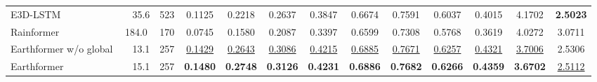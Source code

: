 \documentclass{article}
\begin{document}
\begin{table}[!tb]
\begin{center}
{\begin{tabular}{l|c|c|cccccc|cc|cc}
E3D-LSTM~\cite{wang2018eidetic}     &\ \ 35.6           & 523			    & 0.1125				& 0.2218				& 0.2637				& 0.3847				& 0.6674				& 0.7591				& 0.6037                & 0.4015				& 4.1702				& \textbf{2.5023}		\\
	Rainformer~\cite{bai2022rainformer} & 184.0             & 170				& 0.0745				& 0.1580				& 0.2087				& 0.3397				& 0.6599				& 0.7308				& 0.5768                & 0.3619				& 4.0272				& 3.0711				\\
	\midrule
Earthformer w/o global              &\ \ 13.1           & 257				& \underline{0.1429}	& \underline{0.2643}	& \underline{0.3086}	& \underline{0.4215}	& \underline{0.6885}	& \underline{0.7671}	& \underline{0.6257}    & \underline{0.4321}	& \underline{3.7006}	& 2.5306				\\
	Earthformer			                &\ \ 15.1           & 257				& \textbf{0.1480}		& \textbf{0.2748}		& \textbf{0.3126}		& \textbf{0.4231}		& \textbf{0.6886}		& \textbf{0.7682}		& \textbf{0.6266}       & \textbf{0.4359}		& \textbf{3.6702}		& \underline{2.5112}	\\
	\bottomrule[1.5pt]
	\end{tabular}
	}
	\end{center}
\end{table}
\end{document}
